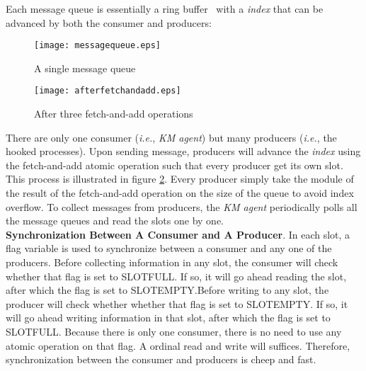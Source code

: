 \documentclass[letterpaper,twocolumn,10pt]{article}
\begin{document}
Each message queue is essentially a ring buffer~\cite{ringbufferLee:2009,
Lynx:2016} with a \textit{index} that can be advanced by both the consumer and
producers: 

\begin{subfigures}
    \begin{figure}[H]
    \centering
    \texttt{[image: messagequeue.eps]}
    \caption{\label{fig:singlemq}A single message queue}
\end{figure}
    \begin{figure}[H]
    \centering
    \texttt{[image: afterfetchandadd.eps]}
    \caption{\label{fig:afterfa}After three fetch-and-add operations}
\end{figure}
\end{subfigures}

\noindent
There are only one consumer (\textit{i.e.}, \textit{KM agent}) but many
producers (\textit{i.e.}, the hooked processes). Upon sending message,
producers will advance the \textit{index} using the fetch-and-add atomic
operation such that every producer get its own slot. This process is
illustrated in figure \ref{fig:afterfa}. Every producer simply take the
module of the result of the fetch-and-add operation on the size of the queue
to avoid index overflow. To collect messages from producers, the \textit{KM
agent} periodically polls all the message queues and read the slots one by
one.\\ 

\noindent
\textbf{Synchronization Between A Consumer and A Producer}. In each slot, a
flag variable is used to synchronize between a consumer and any one of the
producers. Before collecting information in any slot, the consumer will check
whether that flag is set to SLOTFULL. If so, it will go ahead reading the
slot, after which the flag is set to SLOTEMPTY.Before writing to any slot,
the producer will check whether whether that flag is set to SLOTEMPTY. If so,
it will go ahead writing information in that slot, after which the flag is
set to SLOTFULL. Because there is only one consumer, there is no need to use
any atomic operation on that flag. A ordinal read and write will suffices.
Therefore, synchronization between the consumer and producers is cheep and
fast.\\
\end{document}
